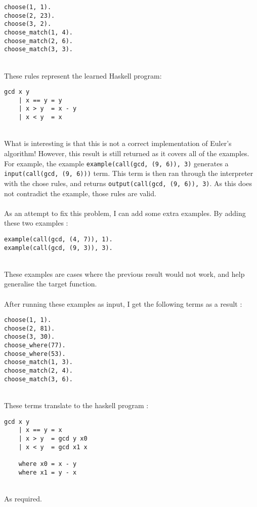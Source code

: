 \begin{multicols}{2}
\begin{lstlisting}
choose(1, 1).
choose(2, 23).
choose(3, 2).
choose_match(1, 4).
choose_match(2, 6).
choose_match(3, 3).
\end{lstlisting}
\end{multicols}
\mbox{}\\
These rules represent the learned Haskell program: \\

\begin{lstlisting}
gcd x y
	| x == y = y
	| x > y  = x - y
	| x < y  = x
\end{lstlisting}
\mbox{}\\
What is interesting is that this is not a correct implementation of Euler's algorithm! However, this result is still returned as it covers all of the examples. For example, the example \lstinline{example(call(gcd, (9, 6)), 3)} generates a \lstinline{input(call(gcd, (9, 6)))} term. This term is then ran through the interpreter with the chose rules, and returns \lstinline{output(call(gcd, (9, 6)), 3)}. As this does not contradict the example, those rules are valid. \\ \\%
As an attempt to fix this problem, I can add some extra examples. By adding these two examples :\\


\begin{lstlisting}
example(call(gcd, (4, 7)), 1).
example(call(gcd, (9, 3)), 3).
\end{lstlisting}
\mbox{}\\
These examples are cases where the previous result would not work, and help generalise the target function. \\ \\
After running these examples as input, I get the following terms as a result : \\

\begin{lstlisting}
choose(1, 1).
choose(2, 81).
choose(3, 30).
choose_where(77).
choose_where(53).
choose_match(1, 3).
choose_match(2, 4).
choose_match(3, 6).
\end{lstlisting}
\mbox{} \\
These terms translate to the haskell program :

\begin{lstlisting}
gcd x y
	| x == y = x
	| x > y  = gcd y x0
	| x < y  = gcd x1 x
	
	where x0 = x - y
	where x1 = y - x
\end{lstlisting}
\mbox{}\\
As required.

